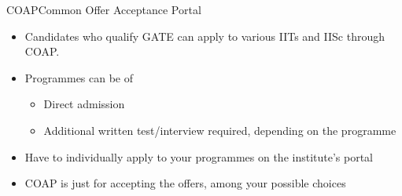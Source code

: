 \documentclass[handout]{beamer}
\begin{document}
\begin{frame}{COAP}{Common Offer Acceptance Portal}
    \begin{itemize}
        \item Candidates who qualify GATE can apply to various IITs and IISc through COAP.
        \item Programmes can be of
              \begin{itemize}
                  \item Direct admission
                  \item Additional written test/interview required, depending on the programme
              \end{itemize}
        \item Have to individually apply to your programmes on the institute's portal
        \item COAP is just for accepting the offers, among your possible choices
    \end{itemize}
\end{frame}
\end{document}
